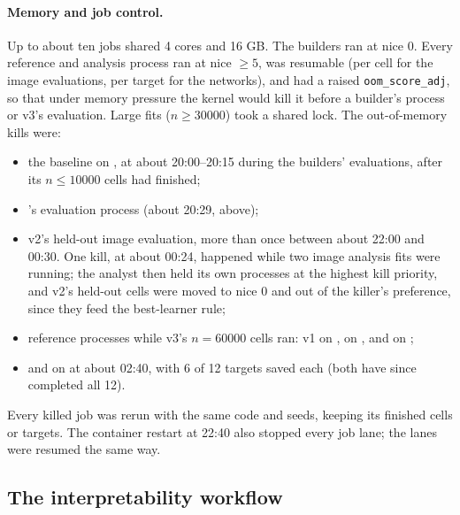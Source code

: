 \paragraph{Memory and job control.} Up to about ten jobs shared 4 cores and 16 GB. The builders ran at nice 0. Every reference and analysis process ran at nice $\ge5$, was resumable (per cell for the image evaluations, per target for the networks), and had a raised \texttt{oom\_score\_adj}, so that under memory pressure the kernel would kill it before a builder's process or v3's evaluation. Large fits ($n\ge30000$) took a shared lock. The out-of-memory kills were:
\begin{itemize}
\item the baseline  on , at about 20:00--20:15 during the builders' evaluations, after its $n\le10000$ cells had finished;
\item {}'s  evaluation process (about 20:29, above);
\item v2's held-out image evaluation, more than once between about 22:00 and 00:30. One kill, at about 00:24, happened while two image analysis fits were running; the analyst then held its own processes at the highest kill priority, and v2's held-out cells were moved to nice 0 and out of the killer's preference, since they feed the best-learner rule;
\item reference processes while v3's $n=60000$ cells ran: v1 on ,  on ,  and  on ;
\item {} and  on  at about 02:40, with 6 of 12 targets saved each (both have since completed all 12).
\end{itemize}
Every killed job was rerun with the same code and seeds, keeping its finished cells or targets. The container restart at 22:40 also stopped every job lane; the lanes were resumed the same way.

\subsection{The interpretability workflow}\label{app:interp-workflow}

